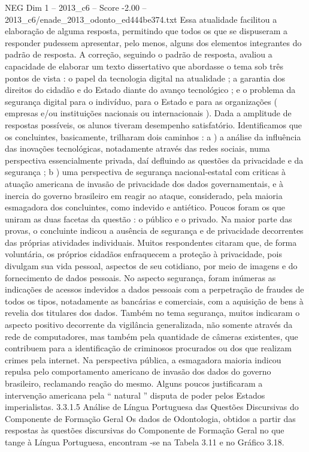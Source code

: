 \begin{textsample}{NEG Dim 1 – 2013\_c6 – Score -2.00 – 2013\_c6/enade\_2013\_odonto\_ed444be374.txt}
Essa atualidade facilitou a elaboração de alguma resposta, permitindo que todos os que se dispuseram a responder pudessem apresentar, pelo menos, alguns dos elementos integrantes do padrão de resposta.
A correção, seguindo o padrão de resposta, avaliou a capacidade de elaborar um texto dissertativo que abordasse o tema sob três pontos de vista : o papel da tecnologia digital na atualidade ; a garantia dos direitos do cidadão e do Estado diante do avanço tecnológico ; e o problema da segurança digital para o indivíduo, para o Estado e para as organizações ( empresas e/ou instituições nacionais ou internacionais ).
Dada a amplitude de respostas possíveis, os alunos tiveram desempenho satisfatório.
Identificamos que os concluintes, basicamente, trilharam dois caminhos : a ) a análise da influência das inovações tecnológicas, notadamente através das redes sociais, numa perspectiva essencialmente privada, daí defluindo as questões da privacidade e da segurança ; b ) uma perspectiva de segurança nacional-estatal com criticas à atuação americana de invasão de privacidade dos dados governamentais, e à inercia do governo brasileiro em reagir ao ataque, considerado, pela maioria esmagadora dos concluintes, como indevido e antiético.
Poucos foram os que uniram as duas facetas da questão : o público e o privado.
Na maior parte das provas, o concluinte indicou a ausência de segurança e de privacidade decorrentes das próprias atividades individuais.
Muitos respondentes citaram que, de forma voluntária, os próprios cidadãos enfraquecem a proteção à privacidade, pois divulgam sua vida pessoal, aspectos de seu cotidiano, por meio de imagens e do fornecimento de dados pessoais.
No aspecto segurança, foram inúmeras as indicações de acessos indevidos a dados pessoais com a perpetração de fraudes de todos os tipos, notadamente as bancárias e comerciais, com a aquisição de bens à revelia dos titulares dos dados.
Também no tema segurança, muitos indicaram o aspecto positivo decorrente da vigilância generalizada, não somente através da rede de computadores, mas também pela quantidade de câmeras existentes, que contribuem para a identificação de criminosos procurados ou dos que realizam crimes pela internet.
Na perspectiva pública, a esmagadora maioria indicou repulsa pelo comportamento americano de invasão dos dados do governo brasileiro, reclamando reação do mesmo.
Alguns poucos justificaram a intervenção americana pela “ natural ” disputa de poder pelos Estados imperialistas. 3.3.1.5 Análise de Língua Portuguesa das Questões Discursivas do Componente de Formação Geral Os dados de Odontologia, obtidos a partir das respostas às questões discursivas do Componente de Formação Geral no que tange à Língua Portuguesa, encontram -se na Tabela 3.11 e no Gráfico 3.18.

\end{textsample}
